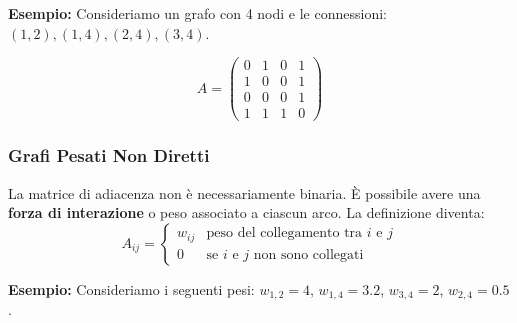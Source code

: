 \noindent \textbf{{Esempio:}} Consideriamo un grafo con 4 nodi e le connessioni: $(1,2), (1,4), (2,4), (3,4)$.

\hfill

\noindent
\begin{minipage}{0.35\textwidth}
\begin{equation*}
A = 
\begin{pmatrix} 
0 & 1 & 0 & 1 \\ 
1 & 0 & 0 & 1 \\ 
0 & 0 & 0 & 1 \\ 
1 & 1 & 1 & 0 
\end{pmatrix}
\end{equation*}
\end{minipage}%
\hfill
\begin{minipage}{0.55\textwidth}
\centering
{}
\end{minipage}



\subsubsection{\textcolor{colorA}{Grafi Pesati Non Diretti}}
La matrice di adiacenza non è necessariamente binaria. È possibile avere una \textbf{forza di interazione} o peso associato a ciascun arco.
La definizione diventa:
\begin{equation}
A_{ij} = 
\begin{cases} 
w_{ij} & \text{peso del collegamento tra } i \text{ e } j \\
0 & \text{se } i \text{ e } j \text{ non sono collegati}
\end{cases}
\end{equation}

\noindent \textbf{Esempio:} 
Consideriamo i seguenti pesi: $w_{1,2}=4$, $w_{1,4}=3.2$, $w_{3,4}=2$, $w_{2,4}=0.5$.

\hfill 

